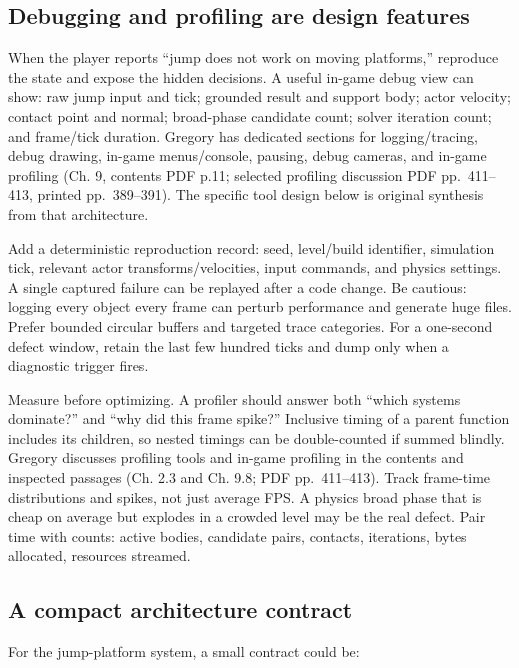 \subsection{Debugging and profiling are design features}\label{06-engine-ii-ch041-debugging-and-profiling-are-design-features}

When the player reports ``jump does not work on moving platforms,'' reproduce the state and expose the hidden decisions. A useful in-game debug view can show: raw jump input and tick; grounded result and support body; actor velocity; contact point and normal; broad-phase candidate count; solver iteration count; and frame/tick duration. Gregory has dedicated sections for logging/tracing, debug drawing, in-game menus/console, pausing, debug cameras, and in-game profiling (Ch. 9, contents PDF p.11; selected profiling discussion PDF pp.~411--413, printed pp.~389--391). The specific tool design below is original synthesis from that architecture.

Add a deterministic reproduction record: seed, level/build identifier, simulation tick, relevant actor transforms/velocities, input commands, and physics settings. A single captured failure can be replayed after a code change. Be cautious: logging every object every frame can perturb performance and generate huge files. Prefer bounded circular buffers and targeted trace categories. For a one-second defect window, retain the last few hundred ticks and dump only when a diagnostic trigger fires.

Measure before optimizing. A profiler should answer both ``which systems dominate?'' and ``why did this frame spike?'' Inclusive timing of a parent function includes its children, so nested timings can be double-counted if summed blindly. Gregory discusses profiling tools and in-game profiling in the contents and inspected passages (Ch. 2.3 and Ch. 9.8; PDF pp.~411--413). Track frame-time distributions and spikes, not just average FPS. A physics broad phase that is cheap on average but explodes in a crowded level may be the real defect. Pair time with counts: active bodies, candidate pairs, contacts, iterations, bytes allocated, resources streamed.

\subsection{A compact architecture contract}\label{06-engine-ii-ch041-a-compact-architecture-contract}

For the jump-platform system, a small contract could be:


